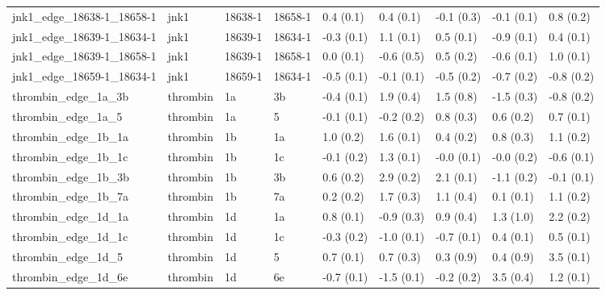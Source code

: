 \begin{tabular}{lllllllll}
jnk1\_edge\_18638-1\_18658-1        &      jnk1 &     18638-1 &     18658-1 &   0.4 (0.1) &         0.4 (0.1) &  -0.1 (0.3) &  -0.1 (0.1) &   0.8 (0.2) \\
jnk1\_edge\_18639-1\_18634-1        &      jnk1 &     18639-1 &     18634-1 &  -0.3 (0.1) &         1.1 (0.1) &   0.5 (0.1) &  -0.9 (0.1) &   0.4 (0.1) \\
jnk1\_edge\_18639-1\_18658-1        &      jnk1 &     18639-1 &     18658-1 &   0.0 (0.1) &        -0.6 (0.5) &   0.5 (0.2) &  -0.6 (0.1) &   1.0 (0.1) \\
jnk1\_edge\_18659-1\_18634-1        &      jnk1 &     18659-1 &     18634-1 &  -0.5 (0.1) &        -0.1 (0.1) &  -0.5 (0.2) &  -0.7 (0.2) &  -0.8 (0.2) \\
thrombin\_edge\_1a\_3b              &  thrombin &          1a &          3b &  -0.4 (0.1) &         1.9 (0.4) &   1.5 (0.8) &  -1.5 (0.3) &  -0.8 (0.2) \\
thrombin\_edge\_1a\_5               &  thrombin &          1a &           5 &  -0.1 (0.1) &        -0.2 (0.2) &   0.8 (0.3) &   0.6 (0.2) &   0.7 (0.1) \\
thrombin\_edge\_1b\_1a              &  thrombin &          1b &          1a &   1.0 (0.2) &         1.6 (0.1) &   0.4 (0.2) &   0.8 (0.3) &   1.1 (0.2) \\
thrombin\_edge\_1b\_1c              &  thrombin &          1b &          1c &  -0.1 (0.2) &         1.3 (0.1) &  -0.0 (0.1) &  -0.0 (0.2) &  -0.6 (0.1) \\
thrombin\_edge\_1b\_3b              &  thrombin &          1b &          3b &   0.6 (0.2) &         2.9 (0.2) &   2.1 (0.1) &  -1.1 (0.2) &  -0.1 (0.1) \\
thrombin\_edge\_1b\_7a              &  thrombin &          1b &          7a &   0.2 (0.2) &         1.7 (0.3) &   1.1 (0.4) &   0.1 (0.1) &   1.1 (0.2) \\
thrombin\_edge\_1d\_1a              &  thrombin &          1d &          1a &   0.8 (0.1) &        -0.9 (0.3) &   0.9 (0.4) &   1.3 (1.0) &   2.2 (0.2) \\
thrombin\_edge\_1d\_1c              &  thrombin &          1d &          1c &  -0.3 (0.2) &        -1.0 (0.1) &  -0.7 (0.1) &   0.4 (0.1) &   0.5 (0.1) \\
thrombin\_edge\_1d\_5               &  thrombin &          1d &           5 &   0.7 (0.1) &         0.7 (0.3) &   0.3 (0.9) &   0.4 (0.9) &   3.5 (0.1) \\
thrombin\_edge\_1d\_6e              &  thrombin &          1d &          6e &  -0.7 (0.1) &        -1.5 (0.1) &  -0.2 (0.2) &   3.5 (0.4) &   1.2 (0.1) \\

\end{tabular}
